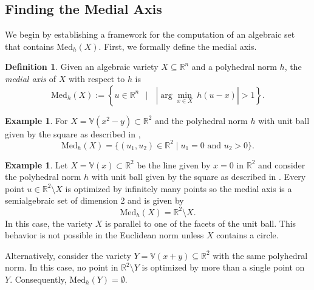\documentclass{article}
\numberwithin{theorem}{section}
\theoremstyle{definition}
\newtheorem{definition}[theorem]{Definition}
\newtheorem{example}[theorem]{Example}
\theoremstyle{example_contd}
\newcommand{\RR}{\mathbb{R}}
\newcommand{\med}{\mathrm{Med}_h}
\newcommand{\V}{{\mathbb{V}}}
\begin{document}
\subsection{Finding the Medial Axis}

We begin by establishing a framework for the computation of an algebraic set that contains $\med(X)$. First, we formally define the medial axis.

\begin{definition} \label{def:medial} Given an algebraic variety $X \subseteq \mathbb{R}^n$ and a polyhedral norm $h$, the \emph{medial axis} of $X$ with respect to $h$ is
	\[\med(X):=\left\{u\in \RR^n ~~\mid~~~ \left|\arg\min_{x\in X} \ h(u-x)\right|> 1\right\}.\]
\end{definition}

\begin{example}\label{ex:med_axis_low_dim}
    For $X=\V(x^2-y)\subset \RR^2$ and the polyhedral norm $h$ with unit ball given by the square as described in , 
    \begin{equation*}
        \med(X)=\{(u_1,u_2)\in \RR^2 \mid u_1=0 \mbox{ and } u_2> 0\}.
    \end{equation*}
\end{example}

\begin{example} \label{ex:med_axis_everything_and_nothing}
Let $X = \V(x) \subset \RR^2$ be the line given by $x=0$ in $\RR^2$ and consider the polyhedral norm $h$ with unit ball given by the square as described in . Every point $u\in \RR^2 \setminus X$ is optimized by infinitely many points so the medial axis is a semialgebraic set of dimension 2 and is given by 
\[ \med(X) = \RR^2 \setminus X. \]
In this case, the variety $X$ is parallel to one of the facets of the unit ball.
This behavior is not possible in the Euclidean norm unless $X$ contains a circle. 

Alternatively, consider the variety $Y = \V(x + y) \subseteq \RR^2$
with the same polyhedral norm. In this case, no point in $\RR^2 \setminus Y$ is optimized by more than a single point on $Y$. Consequently, $\med(Y) = \emptyset$.
\end{example}
\end{document}
